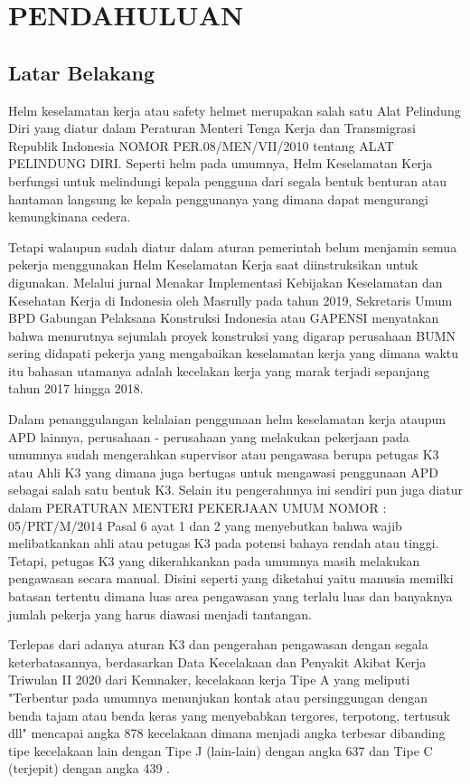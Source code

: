 \chapter{PENDAHULUAN}
\label{chap:pendahuluan}


\section{Latar Belakang}
\label{sec:latarbelakang}

Helm keselamatan kerja atau safety helmet merupakan salah satu Alat Pelindung Diri yang diatur dalam 
Peraturan Menteri Tenga Kerja dan Transmigrasi Republik Indonesia NOMOR PER.08/MEN/VII/2010 tentang ALAT PELINDUNG DIRI. Seperti helm pada umumnya, Helm Keselamatan Kerja berfungsi untuk melindungi kepala pengguna dari segala bentuk benturan atau hantaman langsung ke kepala penggunanya yang dimana dapat mengurangi kemungkinana cedera.

Tetapi walaupun sudah diatur dalam aturan pemerintah belum menjamin semua pekerja menggunakan Helm Keselamatan Kerja saat diinstruksikan untuk digunakan. Melalui jurnal Menakar Implementasi Kebijakan Keselamatan dan Kesehatan Kerja di Indonesia oleh Masrully pada tahun 2019, Sekretaris Umum BPD Gabungan Pelaksana Konstruksi Indonesia atau GAPENSI menyatakan bahwa menurutnya sejumlah proyek konstruksi yang digarap perusahaan BUMN sering didapati pekerja yang mengabaikan keselamatan kerja yang dimana waktu itu bahasan utamanya adalah kecelakan kerja yang marak terjadi sepanjang tahun 2017 hingga 2018.

Dalam penanggulangan kelalaian penggunaan helm keselamatan kerja ataupun APD lainnya, perusahaan - perusahaan yang melakukan pekerjaan pada umumnya sudah mengerahkan supervisor atau pengawasa berupa petugas K3 atau Ahli K3 yang dimana juga bertugas untuk mengawasi penggunaan APD sebagai salah satu bentuk K3. Selain itu pengerahnnya  ini sendiri pun juga diatur dalam PERATURAN MENTERI PEKERJAAN UMUM NOMOR : 05/PRT/M/2014 Pasal 6 ayat 1 dan 2 yang menyebutkan bahwa wajib melibatkankan ahli atau petugas K3 pada potensi bahaya rendah atau tinggi. Tetapi, petugas K3 yang dikerahkankan pada umumnya masih melakukan pengawasan secara manual. Disini seperti yang diketahui yaitu manusia memilki batasan tertentu dimana luas area pengawasan yang terlalu luas dan banyaknya jumlah pekerja yang harus diawasi menjadi tantangan.

Terlepas dari adanya aturan K3 dan pengerahan pengawasan dengan segala keterbatasannya, berdasarkan Data Kecelakaan dan Penyakit Akibat Kerja Triwulan II 2020 dari Kemnaker, kecelakaan kerja Tipe A yang meliputi "Terbentur pada umumnya menunjukan kontak atau persinggungan dengan benda tajam atau benda keras yang menyebabkan tergores, terpotong, tertusuk dll" mencapai angka 878 kecelakaan dimana menjadi angka terbesar dibanding tipe kecelakaan lain dengan Tipe J (lain-lain) dengan angka 637 dan Tipe C (terjepit) dengan angka 439 \cite{satudata_kecelakaan_kerja}.


